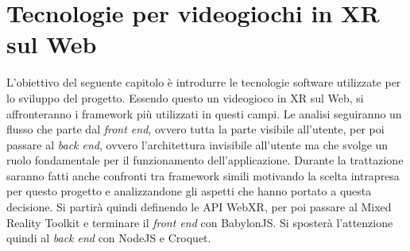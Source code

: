 \chapter{Tecnologie per videogiochi in XR sul Web}\label{chap:Tecnologie}
L'obiettivo del seguente capitolo è introdurre le tecnologie software utilizzate per lo sviluppo del progetto. Essendo questo un videogioco in XR sul Web, si affronteranno i framework
più utilizzati in questi campi. Le analisi seguiranno un flusso che parte dal \textit{front end}, ovvero tutta la parte visibile all'utente, per poi passare al \textit{back end}, ovvero
l'architettura invisibile all'utente ma che svolge un ruolo fondamentale per il funzionamento dell'applicazione. Durante la trattazione saranno fatti anche confronti tra
framework simili motivando la scelta intrapresa per questo progetto e analizzandone gli aspetti che hanno portato a questa decisione. Si partirà quindi definendo le API WebXR, per poi
passare al Mixed Reality Toolkit e terminare il \textit{front end} con BabylonJS. Si sposterà l'attenzione quindi al \textit{back end} con NodeJS e Croquet. 

